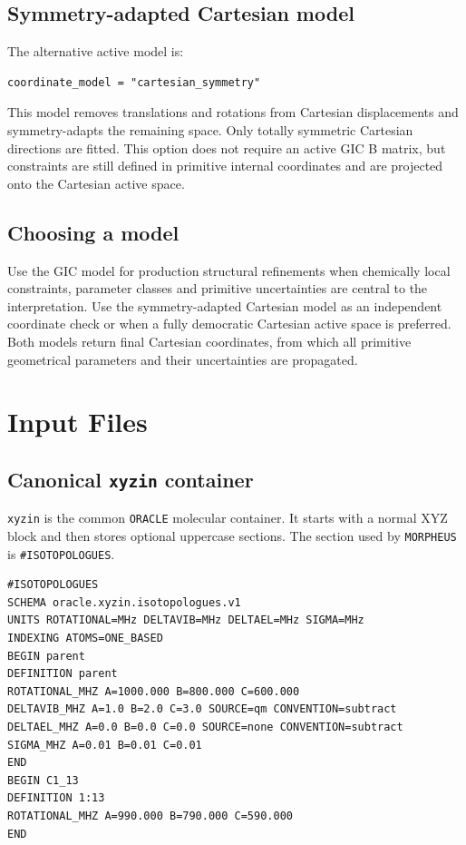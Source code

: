 \documentclass[11pt]{article}
\newcommand{\program}{\texttt{MORPHEUS}}
\newcommand{\oracle}{\texttt{ORACLE}}
\newcommand{\xyzin}{\texttt{xyzin}}
\begin{document}
\subsection{Symmetry-adapted Cartesian model}

The alternative active model is:

\begin{lstlisting}[style=oracle]
coordinate_model = "cartesian_symmetry"
\end{lstlisting}

\noindent
This model removes translations and rotations from Cartesian displacements and
symmetry-adapts the remaining space.  Only totally symmetric Cartesian
directions are fitted.  This option does not require an active GIC B matrix,
but constraints are still defined in primitive internal coordinates and are
projected onto the Cartesian active space.

\subsection{Choosing a model}

Use the GIC model for production structural refinements when chemically local
constraints, parameter classes and primitive uncertainties are central to the
interpretation.  Use the symmetry-adapted Cartesian model as an independent
coordinate check or when a fully democratic Cartesian active space is preferred.
Both models return final Cartesian coordinates, from which all primitive
geometrical parameters and their uncertainties are propagated.

\section{Input Files}

\subsection{Canonical \texttt{xyzin} container}

\xyzin{} is the common \oracle{} molecular container.  It starts with a normal
XYZ block and then stores optional uppercase sections.  The section used by
\program{} is \texttt{\#ISOTOPOLOGUES}.

\begin{lstlisting}[style=oracle]
#ISOTOPOLOGUES
SCHEMA oracle.xyzin.isotopologues.v1
UNITS ROTATIONAL=MHz DELTAVIB=MHz DELTAEL=MHz SIGMA=MHz
INDEXING ATOMS=ONE_BASED
BEGIN parent
DEFINITION parent
ROTATIONAL_MHZ A=1000.000 B=800.000 C=600.000
DELTAVIB_MHZ A=1.0 B=2.0 C=3.0 SOURCE=qm CONVENTION=subtract
DELTAEL_MHZ A=0.0 B=0.0 C=0.0 SOURCE=none CONVENTION=subtract
SIGMA_MHZ A=0.01 B=0.01 C=0.01
END
BEGIN C1_13
DEFINITION 1:13
ROTATIONAL_MHZ A=990.000 B=790.000 C=590.000
END
\end{lstlisting}
\end{document}
